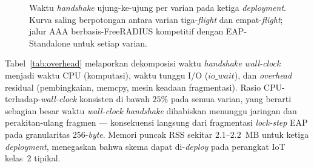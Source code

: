 \documentclass{easychair}
\begin{document}
\begin{figure}[H]
\centering
{}
\caption{Waktu \emph{handshake} ujung-ke-ujung per varian pada ketiga
\emph{deployment}. Kurva saling berpotongan antara varian tiga-\emph{flight}
dan empat-\emph{flight}; jalur AAA berbasis-FreeRADIUS kompetitif
dengan EAP-Standalone untuk setiap varian.}
\label{fig:handshake-line}
\end{figure}
\FloatBarrier
Tabel~\ref{tab:overhead} melaporkan dekomposisi waktu \emph{handshake}
\emph{wall-clock} menjadi waktu CPU (komputasi), waktu tunggu I/O
($\mathit{io\_wait}$), dan \emph{overhead} residual (pembingkaian,
memcpy, mesin keadaan fragmentasi). Rasio CPU-terhadap-\emph{wall-clock}
konsisten di bawah $25\%$ pada semua varian, yang berarti sebagian
besar waktu \emph{wall-clock} \emph{handshake} dihabiskan menunggu
jaringan dan perakitan-ulang fragmen --- konsekuensi langsung dari
fragmentasi \emph{lock-step} EAP pada granularitas 256-\emph{byte}.
Memori puncak RSS sekitar $2.1$--$2.2$~MB untuk ketiga \emph{deployment},
menegaskan bahwa skema dapat di-\emph{deploy} pada perangkat IoT
kelas~2 tipikal.
\end{document}
